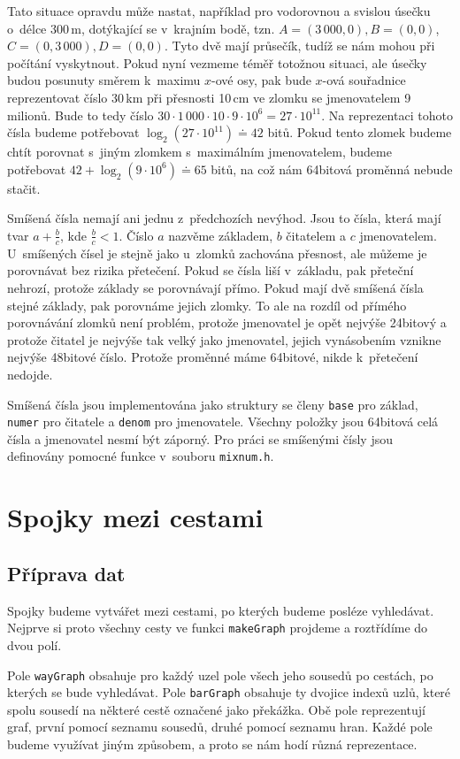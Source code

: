Tato situace opravdu může nastat, například pro vodorovnou a svislou úsečku
o~délce 300\,m, dotýkající se v~krajním bodě, tzn. $A=(3\,000,0),B=(0,0)$,
$C=(0,3\,000),D=(0,0)$. Tyto dvě mají průsečík, tudíž se nám mohou při počítání
vyskytnout. Pokud nyní vezmeme téměř totožnou situaci, ale úsečky budou posunuty
směrem k~maximu $x$-ové osy, pak bude $x$-ová souřadnice reprezentovat číslo
30\,km při přesnosti 10\,cm ve zlomku se jmenovatelem 9 milionů. Bude to tedy
číslo $30\cdot1\,000\cdot10\cdot9\cdot10^6=27 \cdot 10^{11}$. Na reprezentaci tohoto
čísla budeme potřebovat $\log_2 (27\cdot 10^{11}) \doteq 42$ bitů. Pokud tento
zlomek budeme chtít porovnat s~jiným zlomkem s~maximálním jmenovatelem, budeme
potřebovat $42 + \log_2 (9\cdot 10^{6}) \doteq 65$ bitů, na což nám 64bitová proměnná
nebude stačit.

{\tuc Smíšená čísla} nemají ani jednu z~předchozích nevýhod. Jsou to čísla,
která mají tvar $a+\frac{b}{c}$, kde $\frac{b}{c}<1$. Číslo $a$ nazvěme
základem, $b$ čitatelem a $c$ jmenovatelem. U~smíšených čísel je stejně jako
u~zlomků zachována přesnost, ale můžeme je porovnávat bez rizika přetečení.
Pokud se čísla liší v~základu, pak přeteční nehrozí, protože základy se
porovnávají přímo. Pokud mají dvě smíšená čísla stejné základy, pak porovnáme
jejich zlomky. To ale na rozdíl od přímého porovnávání zlomků není problém,
protože jmenovatel je opět nejvýše 24bitový a protože čitatel je nejvýše tak
velký jako jmenovatel, jejich vynásobením vznikne nejvýše 48bitové číslo.
Protože proměnné máme 64bitové, nikde k~přetečení nedojde.

Smíšená čísla jsou implementována jako struktury se členy \verb|base| pro
základ, \verb|numer| pro čitatele a \verb|denom| pro jmenovatele. Všechny
položky jsou 64bitová celá čísla a jmenovatel nesmí být záporný. Pro práci se
smíšenými čísly jsou definovány pomocné funkce v~souboru \verb|mixnum.h|.

\section{Spojky mezi cestami}
\subsection{Příprava dat}
Spojky budeme vytvářet mezi cestami, po kterých budeme posléze vyhledávat.
Nejprve si proto všechny cesty ve funkci \verb|makeGraph| projdeme a roztřídíme
do dvou polí. 

Pole \verb|wayGraph| obsahuje pro každý uzel pole všech jeho sousedů po cestách,
po kterých se bude vyhledávat. Pole \verb|barGraph| obsahuje ty dvojice indexů
uzlů, které spolu sousedí na některé cestě označené jako překážka. Obě pole
reprezentují graf, první pomocí seznamu sousedů, druhé pomocí seznamu hran.
Každé pole budeme využívat jiným způsobem, a proto se nám hodí různá
reprezentace.

